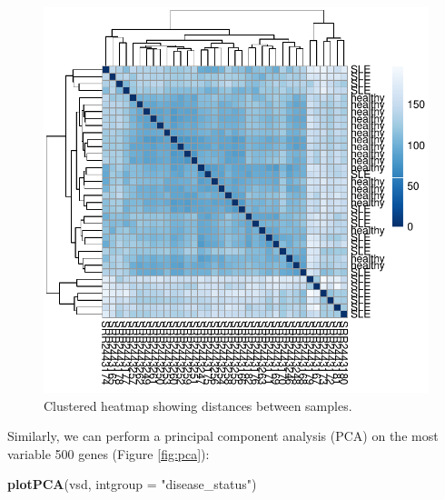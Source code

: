 \documentclass[9pt,a4paper,]{extarticle}
\newenvironment{Shaded}{\begin{snugshade}}{\end{snugshade}}
\newcommand{\KeywordTok}[1]{\textcolor[rgb]{0.13,0.29,0.53}{\textbf{#1}}}
\newcommand{\DataTypeTok}[1]{\textcolor[rgb]{0.13,0.29,0.53}{#1}}
\newcommand{\StringTok}[1]{\textcolor[rgb]{0.31,0.60,0.02}{#1}}
\newcommand{\NormalTok}[1]{#1}
\begin{document}
\begin{figure}

{\centering \includegraphics{biocondutor-regulatory-genomics-workflow_files/figure-latex/heatmap-1} 

}

\caption{Clustered heatmap showing distances between samples.}\label{fig:heatmap}
\end{figure}

Similarly, we can perform a principal component analysis (PCA) on the most variable 500 genes (Figure \ref{fig:pca}):

\begin{Shaded}
\begin{Highlighting}[]
\KeywordTok{plotPCA}\NormalTok{(vsd, }\DataTypeTok{intgroup =} \StringTok{"disease_status"}\NormalTok{)}
\end{Highlighting}
\end{Shaded}
\end{document}
